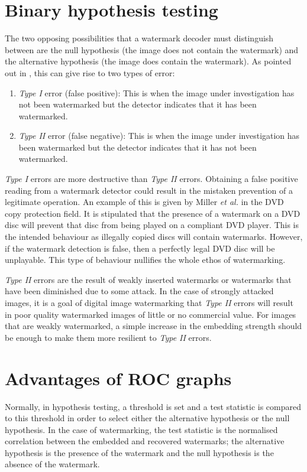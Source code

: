 \documentclass[12pt]{report}
\begin{document}
\section{Binary hypothesis testing}
The two opposing possibilities that a watermark decoder must distinguish between are the null hypothesis
(the image does not contain the watermark) and the alternative hypothesis (the image 
does contain the watermark). 
As pointed out in \cite{ECCb4:book}, this can give rise to two types of error:
\begin{enumerate}
	\item \emph{Type I} error (false positive): This is when the image under investigation
	has not been watermarked but the detector indicates that it has been watermarked. 
	\item \emph{Type II} error (false negative): This is when the image under investigation
	has been watermarked but the detector indicates that it has not been watermarked.
\end{enumerate}

\emph{Type I} errors are more destructive than \emph{Type II} errors. Obtaining a false positive
reading from a watermark detector could result in the mistaken prevention of a legitimate operation.
An example of this is given by Miller \emph{et al.} \cite{millerBloom} in the DVD copy protection field. 
It is stipulated that the presence of a watermark on a DVD disc will prevent that disc from being played on
a compliant DVD player. This is the intended behaviour as illegally copied discs will contain watermarks.
However, if the watermark detection is false, then a perfectly legal DVD disc will be unplayable. 
This type of behaviour nullifies the whole ethos of watermarking.

\emph{Type II} errors are the result of weakly inserted watermarks or watermarks that have been
diminished due to some attack.
In the case of strongly attacked images, it is a goal of digital image watermarking that 
\emph{Type II} errors will result 
in poor quality watermarked images of little or no commercial value.
For images that are weakly watermarked, a simple increase in the embedding strength should be enough
to make them more resilient to \emph{Type II} errors.


\section{Advantages of ROC graphs}
Normally, in hypothesis testing, a threshold is set and a test statistic is 
compared to this threshold in order to select either the alternative hypothesis
or the null hypothesis. 
In the case of watermarking, the test statistic is the normalised correlation between the embedded and
recovered watermarks; the alternative hypothesis is the presence of the watermark and the 
null hypothesis is the absence of the watermark.
\end{document}
